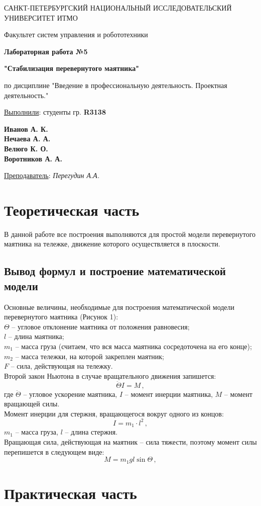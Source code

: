 \documentclass[a5paper, 10pt]{article}
\theoremstyle{definition}
\theoremstyle{plain}
\theoremstyle{remark}
\newcommand*{\titlePage}{
	\thispagestyle{title}
	\begingroup
	\begin{center}
		\vspace*{6ex}
		
		{\small
			САНКТ-ПЕТЕРБУРГСКИЙ НАЦИОНАЛЬНЫЙ ИССЛЕДОВАТЕЛЬСКИЙ УНИВЕРСИТЕТ ИТМО
		}
		
		\vspace*{2ex}
		
		{\normalsize
			Факультет систем управления и робототехники
		}
		
		\vspace*{15ex}
		
		{\Large \bfseries 
			Лабораторная работа  №5
		}

                     \vspace*{2ex}
{\Large \bfseries 
			"Стабилизация перевернутого маятника"
		}

                     \vspace*{2ex}
		
		{\normalsize
			по дисциплине "Введение в профессиональную деятельность. Проектная деятельность."
		}
                     \vspace*{2ex}
	\end{center}
	\vspace*{10ex}
	\begin{flushright}
		{\large 
			\underline{Выполнили}: студенты гр. \textbf{R3138}\\
			\begin{flushright}
				\textbf{Иванов А. К.}\\
                                           \textbf{Нечаева А. А.}\\
                                           \textbf{Велюго К. О.}\\
                                           \textbf{Воротников А. А.}\\
			\end{flushright}
		}
		
		\vspace*{5ex}
		
		{\large 
			\underline{Преподаватель}: \textit{Перегудин А.А.}
		}
	\end{flushright}	
	\newpage
	\setcounter{page}{2}
	\endgroup}
\begin{document}
	\titlePage
	\pagestyle{style}


\newpage
\section{Теоретическая часть}	
В данной работе все построения выполняются для простой модели перевернутого маятника на тележке, движение которого осуществляется в плоскости.

\subsection{Вывод формул и построение математической модели}	
Основные величины, необходимые для построения математической модели перевернутого маятника (Рисунок 1):\\
$\Theta $ -- угловое отклонение маятника от положения равновесия;\\
$l$ -- длина маятника;\\
$m_1$ -- масса груза (считаем, что вся масса маятника сосредоточена на его конце);\\
$m_2$ -- масса тележки, на которой закреплен маятник;\\
$F$ -- сила, действующая на тележку.\\
Второй закон Ньютона в случае вращательного движения запишется:
\begin{equation}
\ddot{\Theta}I = M \, ,
\end{equation}
где $\ddot{\Theta}$ -- угловое ускорение маятника, $I$ -- момент инерции маятника, $M$ -- момент вращающей силы.\\
Момент инерции для стержня, вращающегося вокруг одного из концов:
\begin{equation}
I = m_1 \cdot l^2 \, ,
\end{equation}
$m_1$ -- масса груза, $l$ -- длина стержня.\\
Вращающая сила, действующая на маятник -- сила тяжести, поэтому момент силы перепишется в следующем виде:
\begin{equation}
M = m_1 g l \sin \Theta \, ,
\end{equation}



\newpage
\section{Практическая часть}	
\end{document}
